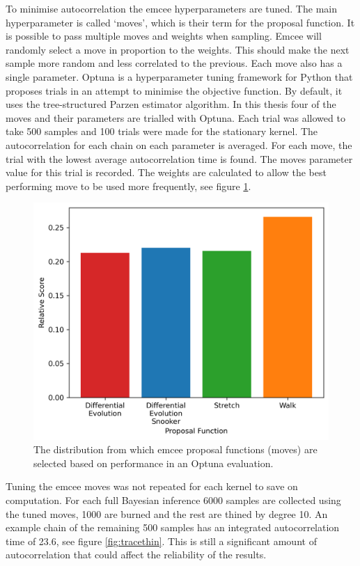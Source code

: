 To minimise autocorrelation the emcee hyperparameters are tuned. The main hyperparameter is called `moves', which is their term for the proposal function. It is possible to pass multiple moves and weights when sampling. Emcee will randomly select a move in proportion to the weights. This should make the next sample more random and less correlated to the previous. Each move also has a single parameter. Optuna is a hyperparameter tuning framework for Python that proposes trials in an attempt to minimise the objective function. By default, it uses the tree-structured Parzen estimator algorithm. In this thesis four of the moves and their parameters are trialled with Optuna. Each trial was allowed to take 500 samples and 100 trials were made for the stationary kernel. The autocorrelation for each chain on each parameter is averaged. For each move, the trial with the lowest average autocorrelation time is found. The moves parameter value for this trial is recorded. The weights are calculated to allow the best performing move to be used more frequently, see figure \ref{fig:optuna}. 

\begin{figure}[H]
    \centering
    \includegraphics[width=380pt]{images/Final/optuna.png}
    \caption{The distribution from which emcee proposal functions (moves) are selected based on performance in an Optuna evaluation.}
    \label{fig:optuna}
\end{figure}

Tuning the emcee moves was not repeated for each kernel to save on computation. For each full Bayesian inference 6000 samples are collected using the tuned moves, 1000 are burned and the rest are thined by degree 10. An example chain of the remaining 500 samples has an integrated autocorrelation time of 23.6, see figure \ref{fig:tracethin}. This is still a significant amount of autocorrelation that could affect the reliability of the results.

